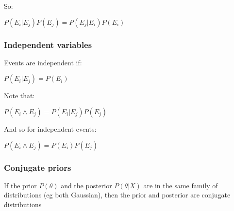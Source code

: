 So:

\(P(E_i|E_j)P(E_j)=P(E_j|E_i)P(E_i)\)

\subsubsection{Independent variables}

Events are independent if:

\(P(E_i|E_j)=P(E_i)\)

Note that:

\(P(E_i\land E_j)=P(E_i|E_j)P(E_j)\)

And so for independent events:

\(P(E_i\land E_j)=P(E_i)P(E_j)\)

\subsubsection{Conjugate priors}

If the prior \(P(\theta)\) and the posterior \(P(\theta | X)\) are in the same family of distributions (eg both Gaussian), then the prior and posterior are conjugate distributions

